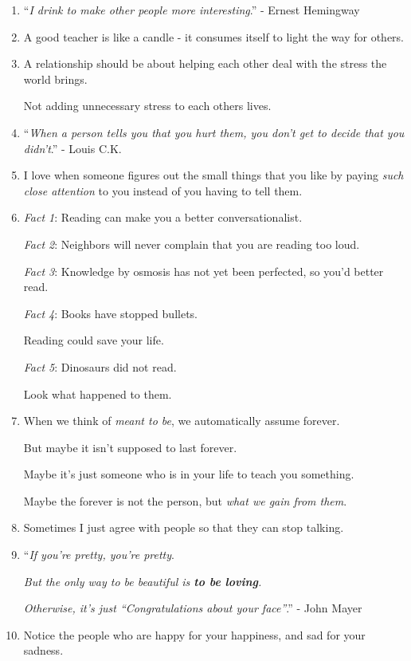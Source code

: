 \documentclass{article}
\numberwithin{equation}{section}
\begin{document}
\begin{enumerate}
    Because I paid for it and I have a washing machine!!
    \item ``\textit{I drink to make other people more interesting}.'' - Ernest Hemingway
    \item A good teacher is like a candle - it consumes itself to light the way for others.
    \item A relationship should be about helping each other deal with the stress the world brings.
    
    Not adding unnecessary stress to each others lives.
    \item ``\textit{When a person tells you that you hurt them, you don't get to decide that you didn't}.'' - Louis C.K.
    \item I love when someone figures out the small things that you like by paying \textit{such close attention} to you instead of you having to tell them.
    \item \textit{Fact 1}: Reading can make you a better conversationalist.
    
    \textit{Fact 2}: Neighbors will never complain that you are reading too loud.
    
    \textit{Fact 3}: Knowledge by osmosis has not yet been perfected, so you'd better read.
    
    \textit{Fact 4}: Books have stopped bullets.
    
    Reading could save your life.
    
    \textit{Fact 5}: Dinosaurs did not read.
    
    Look what happened to them.
    \item When we think of \textit{meant to be}, we automatically assume forever.
    
    But maybe it isn't supposed to last forever.
    
    Maybe it's just someone who is in your life to teach you something.
    
    Maybe the forever is not the person, but \textit{what we gain from them}.
    \item Sometimes I just agree with people so that they can stop talking.
    \item ``\textit{If you're pretty, you're pretty}.
    
    \textit{But the only way to be beautiful is \textbf{to be loving}.}
    
    \textit{Otherwise, it's just ``Congratulations about your face''}.'' - John Mayer
    \item Notice the people who are happy for your happiness, and sad for your sadness.
    

\end{enumerate}
\end{document}
